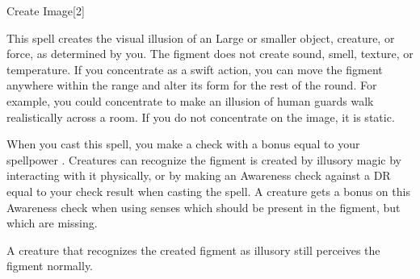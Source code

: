 \begin{spellsection}{Create Image}[2]
    \begin{spellheader}
    \end{spellheader}
    \begin{spellcontent}
        \begin{spelltargetinginfo}
            \spellrng{\rngmed}
        \end{spelltargetinginfo}
        \begin{spelleffects}
            \spelleffect This spell creates the visual illusion of an Large or smaller object, creature, or force, as determined by you. The figment does not create sound, smell, texture, or temperature. If you concentrate as a swift action, you can move the figment anywhere within the range and alter its form for the rest of the round. For example, you could concentrate to make an illusion of human guards walk realistically across a room. If you do not concentrate on the image, it is static.

            When you cast this spell, you make a check with a bonus equal to your spellpower . Creatures can recognize the figment is created by illusory magic by interacting with it physically, or by making an Awareness check against a DR equal to your check result when casting the spell. A creature gets a  bonus on this Awareness check when using senses which should be present in the figment, but which are missing.
            \spelldur \durshort
        \end{spelleffects}
    \end{spellcontent}
    \begin{spellfooter}
        \spellnotes A creature that recognizes the created figment as illusory still perceives the figment normally.
        \miscastexplode
    \end{spellfooter}
    \begin{spellaugments}
    \end{spellaugments}
\end{spellsection}

